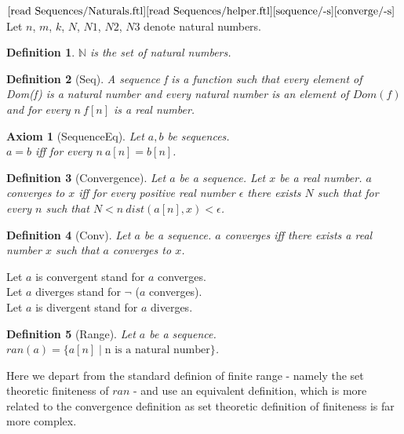 \documentclass{article}
\newenvironment{forthel}{\begin{leftbar}}{\end{leftbar}}
\newtheorem{axiom}{Axiom}
\newtheorem{definition}{Definition}
\newcommand{\NN}{\mathbb{N}}
\begin{document}
\begin{forthel}
	\noindent $\text{[read Sequences/Naturals.ftl]}\\
	\text{[read Sequences/helper.ftl]}\\
	\text{[sequence/-s]}
	\text{[converge/-s]}$\\
	Let $n$, $m$, $k$, $N$, $N1$, $N2$, $N3$ denote natural numbers.

	\begin{definition}
		$\NN$ is the set of natural numbers.
	\end{definition}
	
	\begin{definition}[Seq]	A sequence f is a function such that every element of Dom(f) is a natural number and every
	natural number is an element of $Dom(f)$ and for every $n \ f[n]$ is a real number.
	\end{definition}
	
	\begin{axiom}[SequenceEq] Let $a, b$ be sequences. \\ $a = b$ iff for every $n \ a[n] = b[n]$.
	\end{axiom}
	
	\begin{definition}[Convergence] Let $a$ be a sequence. Let $x$ be a real number. $a$ converges to $x$ iff for every positive real
	number $\epsilon$ there exists $N$ such that for every $n$ such that $N < n \ dist(a[n],x) < \epsilon$.
	\end{definition}
	
	\begin{definition}[Conv] Let $a$ be a sequence. $a$ converges iff there exists a real number $x$ such that $a$ converges to $x$.
	\end{definition}
	
	\noindent Let $a$ is convergent stand for $a$ converges.
	\\Let $a$ diverges stand for $\neg$ ($a$ converges).
	\\Let $a$ is divergent stand for $a$ diverges.
	
	\begin{definition}[Range] Let $a$ be a sequence. \\ $ran(a) = \{a[n] \mid \text{n is a natural number} \}$. 
	\end{definition}
\end{forthel}

\noindent Here we depart from the standard definion of finite range - namely the set theoretic finiteness of $ran$ - and use an equivalent definition, which is more related to the convergence definition as set theoretic definition of finiteness is far more complex.
\end{document}
